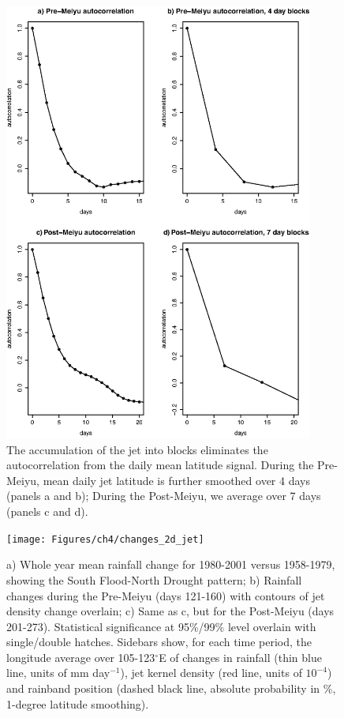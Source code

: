 \begin{figure}[htbp]
\centering
\includegraphics[width=24pc]{Figures/ch4/jet_autocorr}
\caption{The accumulation of the jet into blocks eliminates the autocorrelation from the daily mean latitude signal. During the Pre-Meiyu, mean daily jet latitude is further smoothed over 4 days (panels a and b); During the Post-Meiyu, we average over 7 days (panels c and d).}
\label{fig:jet_autocorr}
\end{figure}

\begin{figure}
\centering
\noindent\texttt{[image: Figures/ch4/changes\_2d\_jet]}
\caption{a) Whole year mean rainfall change for 1980-2001 versus 1958-1979, showing the South Flood-North Drought pattern; b) Rainfall changes during the Pre-Meiyu (days 121-160) with contours of jet density change overlain; c) Same as c, but for the Post-Meiyu (days 201-273). Statistical significance at 95\%/99\% level overlain with single/double hatches. Sidebars show, for each time period, the longitude average over 105-123$^{\circ}$E of changes in rainfall (thin blue line, units of mm day$^{-1}$), jet kernel density (red line, units of $10^{-4}$) and rainband position (dashed black line, absolute probability in \%, 1-degree latitude smoothing).}
\label{fig:changes_2d}
\end{figure}

